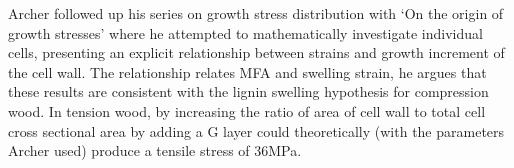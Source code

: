 Archer followed up his series on growth stress distribution with `On the origin
of growth stresses' \citep{archer1987,archer1989} where he attempted to mathematically investigate individual
cells, presenting an explicit relationship between strains and growth
increment of the cell wall. The relationship relates MFA and swelling strain,
he argues that these results are consistent with the lignin swelling hypothesis
for compression wood. In tension wood, by increasing the ratio of area of cell
wall to total cell cross sectional area by adding a G layer could theoretically
(with the parameters Archer used) produce a tensile stress of 36MPa.
